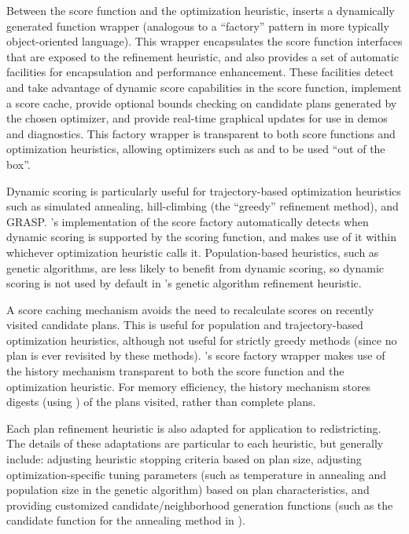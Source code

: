 \documentclass[article]{JSSstyle/jss}
\begin{document}
Between the score function and the optimization heuristic,  inserts a dynamically 
generated function wrapper (analogous to a ``factory'' pattern in more typically object-oriented 
language). This wrapper encapsulates the score function interfaces that are exposed to the 
refinement heuristic, and also provides a set of automatic facilities for encapsulation 
and performance enhancement. These facilities detect and take advantage of dynamic score capabilities 
in the score function, implement a score cache, provide optional bounds checking on candidate 
plans generated by the chosen optimizer, and provide real-time graphical updates for use in demos and diagnostics. 
This factory wrapper is transparent to both score functions and optimization heuristics, 
allowing optimizers such as  and  to be used ``out of the box''.

Dynamic scoring is particularly useful for trajectory-based optimization heuristics such as 
simulated annealing, hill-climbing (the ``greedy'' refinement method), and GRASP. 's implementation 
of the score factory automatically detects when dynamic scoring is supported by the scoring function, and makes use of 
it within whichever optimization heuristic calls it. Population-based heuristics, such as 
genetic algorithms, are less likely to benefit from dynamic scoring, so dynamic scoring is not used by 
default in 's genetic algorithm refinement heuristic.

A score caching mechanism avoids the need to recalculate scores on recently visited candidate plans. This is 
useful for population and trajectory-based optimization heuristics, although not useful for 
strictly greedy methods (since no plan is ever revisited by these methods). 's score 
factory wrapper makes use of the history mechanism transparent to both the score function 
and the optimization heuristic. For memory efficiency, the history mechanism stores 
digests (using  \citet{Eddelbuettel07}) of the plans visited, rather than complete plans.

Each plan refinement heuristic is also adapted for application to redistricting. The details of 
these adaptations are particular to each heuristic, but generally include: adjusting heuristic 
stopping criteria based on plan size, adjusting optimization-specific tuning parameters (such as 
temperature in annealing and population size in the genetic algorithm) based on plan characteristics, 
and providing customized candidate/neighborhood generation functions (such as the candidate function 
for the annealing method in ).
\end{document}
